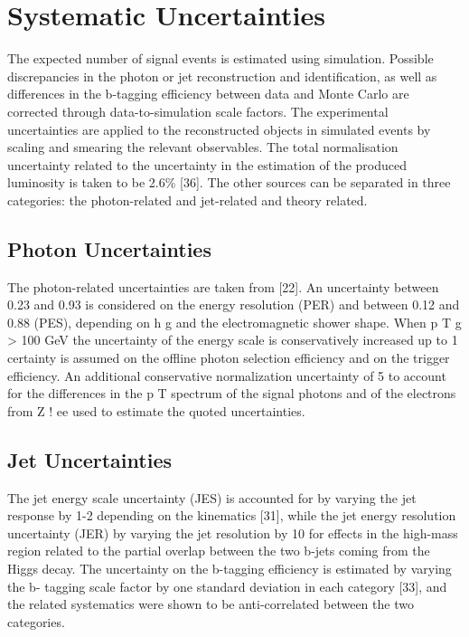 \chapter{Systematic Uncertainties\label{ch:uncertainties}}

The expected number of signal events is estimated using simulation.  Possible discrepancies
in the photon or jet reconstruction and identification, as well as differences in the b-tagging
efficiency between data and Monte Carlo are corrected through data-to-simulation scale factors.
The experimental uncertainties are applied to the reconstructed objects in simulated events by
scaling and smearing the relevant observables.  The total normalisation uncertainty related to
the uncertainty in the estimation of the produced luminosity is taken to be 2.6\% [36].  The
other sources can be separated in three categories: the photon-related and jet-related and theory related.

\section{Photon Uncertainties\label{sec:photonunc}}

The photon-related uncertainties are taken from [22].  An uncertainty between 0.23 and 0.93%
is considered on the energy resolution (PER) and between 0.12 and 0.88%
(PES),  depending  on
h
g
and  the  electromagnetic  shower  shape.   When
p
T
g
>
100  GeV  the
uncertainty of the energy scale is conservatively increased up to 1%
certainty is assumed on the offline photon selection efficiency and on the trigger efficiency. An
additional conservative normalization uncertainty of 5%
to account for the differences in the p
T
spectrum of the signal photons and of the electrons from
Z
!
ee used to estimate the quoted uncertainties.

\section{Jet Uncertainties\label{sec:jetunc}}

The jet energy scale uncertainty (JES) is accounted for by varying the jet response by 1-2%
depending on the kinematics [31], while the jet energy resolution uncertainty (JER) by varying
the jet resolution by 10%
for effects in the high-mass region related to the partial overlap between the two b-jets coming
from the Higgs decay. The uncertainty on the b-tagging efficiency is estimated by varying the b-
tagging scale factor by one standard deviation in each category [33], and the related systematics
were shown to be anti-correlated between the two categories.

